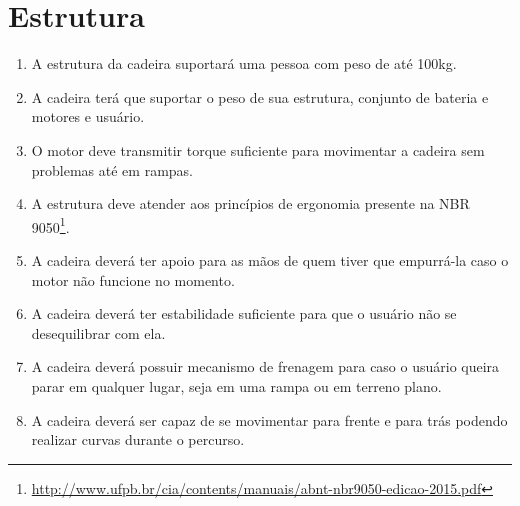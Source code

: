 \section{Estrutura}

\begin{enumerate}[resume*]
  \item A estrutura da cadeira suportará uma pessoa com peso de até 100kg.
  \item A cadeira terá que suportar o peso de sua estrutura, conjunto de bateria
    e motores e usuário.
  \item O motor deve transmitir torque suficiente para movimentar a cadeira sem
    problemas até em rampas.
  \item A estrutura deve atender aos princípios de ergonomia presente na NBR
    9050\footnote{\url{http://www.ufpb.br/cia/contents/manuais/abnt-nbr9050-edicao-2015.pdf}}.
  \item A cadeira deverá ter apoio para as mãos de quem tiver que empurrá-la
    caso o motor não funcione no momento.
  \item A cadeira deverá ter estabilidade suficiente para que o usuário não se
    desequilibrar com ela.
  \item A cadeira deverá possuir mecanismo de frenagem para caso o usuário
    queira parar em qualquer lugar, seja em uma rampa ou em terreno plano.
  \item A cadeira deverá ser capaz de se movimentar para frente e para trás
    podendo realizar curvas durante o percurso.
\end{enumerate}
